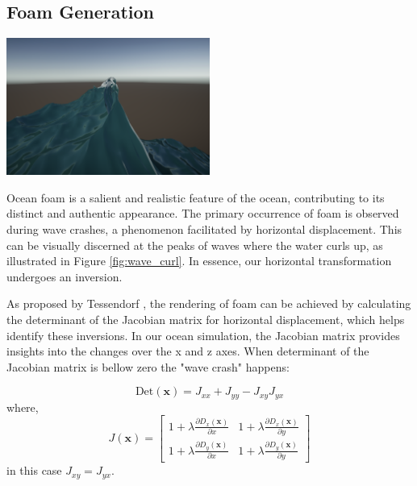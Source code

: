 \subsection{Foam Generation}
\begin{minipage}{1\textwidth}
    \centering
    \includegraphics[width=0.50\textwidth]{"images/wave_curl.png"}
    \label{fig:wave_curl}
\end{minipage}

Ocean foam is a salient and realistic feature of the ocean, contributing to its distinct and authentic appearance. The primary occurrence of foam is observed during wave crashes, a phenomenon facilitated by horizontal displacement. This can be visually discerned at the peaks of waves where the water curls up, as illustrated in Figure \ref{fig:wave_curl}. In essence, our horizontal transformation undergoes an inversion.

As proposed by Tessendorf \cite{tessendorf2001}, the rendering of foam can be achieved by calculating the determinant of the Jacobian matrix for horizontal displacement, which helps identify these inversions. In our ocean simulation, the Jacobian matrix provides insights into the changes over the x and z axes. When determinant of the Jacobian matrix is bellow zero the "wave crash" happens:

\begin{equation}
    \text{Det}(\mathbf{x}) = J_{xx} + J_{yy} - J_{xy} J_{yx}
\end{equation}
where,
\begin{equation}
    J(\mathbf{x}) = 
    \begin{bmatrix} 
        1 + \lambda\frac{\partial D_x(\mathbf{x})}{\partial x} & 1 + \lambda\frac{\partial D_x(\mathbf{x})}{\partial y} \\
        1 + \lambda\frac{\partial D_y(\mathbf{x})}{\partial x} & 1 + \lambda\frac{\partial D_y(\mathbf{x})}{\partial y} 
    \end{bmatrix} 
\end{equation}
in this case $J_{xy} = J_{yx}$.

